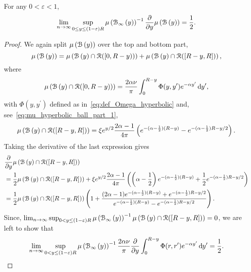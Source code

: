 \begin{lemma}
For any $0 < \varepsilon < 1$,
\[
	\lim_{n \to \infty} \sup_{0 \le y \le (1-\varepsilon)R} \mu\left({\mathcal B}_{\infty}\left(y\right)\right)^{-1}
	\frac{\partial}{\partial y} \mu\left({\mathcal B}\left(y\right)\right) 
	= \frac{1}{2}.
\]
\end{lemma}

\begin{proof}
We again split $\mu\left({\mathcal B}\left(y\right)\right)$ over the top and bottom part,
\[
	\mu\left({\mathcal B}\left(y\right)\right) 
	= \mu\left({\mathcal B}\left(y\right) \cap {\mathcal R} ([0,R - y))\right) + \mu\left({\mathcal B}\left(y\right) \cap {\mathcal R} ([R - y, R])\right),
\]
where
\[
	\mu\left({\mathcal B}\left(y\right) \cap {\mathcal R} ([0,R - y))\right) = \frac{2\alpha \nu}{\pi}\int_0^{R - y} \Phi(y,y^\prime) 
		e^{-\alpha y^\prime} \operatorname{\mathrm{d}\hspace{-2pt}} y^\prime,
\]
with $\Phi(y,y^\prime)$ defined as in~\eqref{eq:def_Omega_hyperbolic} and, see~\eqref{eq:mu_hyperbolic_ball_part_1},
\[
	\mu\left({\mathcal B}\left(y\right) \cap {\mathcal R} ([R - y, R])\right)
	= \xi e^{y/2}\frac{2\alpha - 1}{4\pi} \left( e^{-(\alpha - \frac{1}{2})(R - y)}
	- e^{-(\alpha - \frac{1}{2})R - y/2}\right).
\]
Taking the derivative of the last expression gives
\begin{align*}
	&\frac{\partial}{\partial y} \mu\left({\mathcal B}\left(y\right) \cap {\mathcal R} ([R - y, R])\right)\\
	&= \frac{1}{2}\mu\left({\mathcal B}\left(y\right) \cap {\mathcal R} ([R - y, R])\right)
		+ \xi e^{y/2}\frac{2\alpha - 1}{4\pi}\left(
		\left(\alpha - \frac{1}{2}\right)e^{-(\alpha - \frac{1}{2})(R - y)} 
		+ \frac{1}{2}e^{-(\alpha - \frac{1}{2})R - y/2}\right)\\
	&= \frac{1}{2}\mu\left({\mathcal B}\left(y\right) \cap {\mathcal R} ([R - y, R])\right)\left(1 +
		\frac{(2\alpha - 1)e^{-(\alpha - \frac{1}{2})(R - y)} + e^{-(\alpha - \frac{1}{2})R - y/2}}
		{e^{-(\alpha - \frac{1}{2})(R - y)} - e^{-(\alpha - \frac{1}{2})R - y/2}}\right).
\end{align*}
Since, $\lim_{n \to \infty} \sup_{0 < y \le (1-\varepsilon)R} \mu\left({\mathcal B}_{\infty}\left(y\right)\right)^{-1} \mu\left({\mathcal B}\left(y\right) \cap {\mathcal R} ([R - y, R])\right) = 0$, we are left to show that
\begin{equation}\label{eq:derivative_mu_hyp_ball_main}
	\lim_{n \to \infty} \sup_{0 < y \le (1-\varepsilon)R} \mu\left({\mathcal B}_{\infty}\left(y\right)\right)^{-1} \frac{2\alpha \nu}{\pi} \frac{\partial}{\partial y} \int_0^{R - y} \Phi(r,r^\prime) e^{-\alpha y^\prime} \operatorname{\mathrm{d}\hspace{-2pt}} y^\prime
	= \frac{1}{2}.
\end{equation}


\end{proof}
